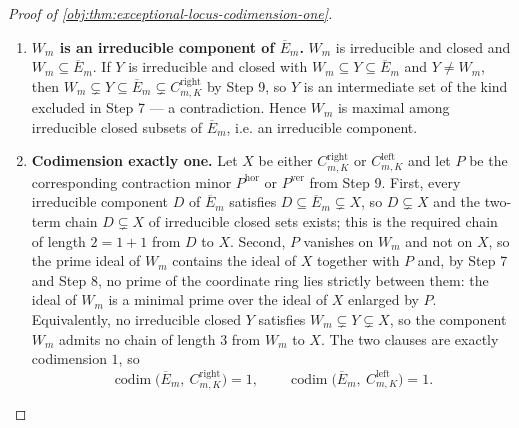 \begin{proof}[Proof of \cref{obj:thm:exceptional-locus-codimension-one}]
\begin{enumerate}

\item \textbf{\(W_m\) is an irreducible component of \(\overline E_m\).}  \(W_m\) is irreducible and closed and \(W_m\subseteq\overline E_m\).  If \(Y\) is irreducible and closed with \(W_m\subseteq Y\subseteq\overline E_m\) and \(Y\ne W_m\), then \(W_m\subsetneq Y\subseteq\overline E_m\subsetneq C^{\mathrm{right}}_{m,K}\) by Step 9, so \(Y\) is an intermediate set of the kind excluded in Step 7 — a contradiction.  Hence \(W_m\) is maximal among irreducible closed subsets of \(\overline E_m\), i.e. an irreducible component.

\item \textbf{Codimension exactly one.}  Let \(X\) be either \(C^{\mathrm{right}}_{m,K}\) or \(C^{\mathrm{left}}_{m,K}\) and let \(P\) be the corresponding contraction minor \(P^{\mathrm{hor}}\) or \(P^{\mathrm{ver}}\) from Step 9.  First, every irreducible component \(D\) of \(\overline E_m\) satisfies \(D\subseteq\overline E_m\subsetneq X\), so \(D\subsetneq X\) and the two-term chain \(D\subsetneq X\) of irreducible closed sets exists; this is the required chain of length \(2=1+1\) from \(D\) to \(X\).  Second, \(P\) vanishes on \(W_m\) and not on \(X\), so the prime ideal of \(W_m\) contains the ideal of \(X\) together with \(P\) and, by Step 7 and Step 8, no prime of the coordinate ring lies strictly between them: the ideal of \(W_m\) is a minimal prime over the ideal of \(X\) enlarged by \(P\).  Equivalently, no irreducible closed \(Y\) satisfies \(W_m\subsetneq Y\subsetneq X\), so the component \(W_m\) admits no chain of length \(3\) from \(W_m\) to \(X\).  The two clauses are exactly codimension \(1\), so
\[
\operatorname{codim}\bigl(\overline E_m,\ C^{\mathrm{right}}_{m,K}\bigr)=1,
\qquad
\operatorname{codim}\bigl(\overline E_m,\ C^{\mathrm{left}}_{m,K}\bigr)=1 .
\]


\end{enumerate}
\end{proof}
